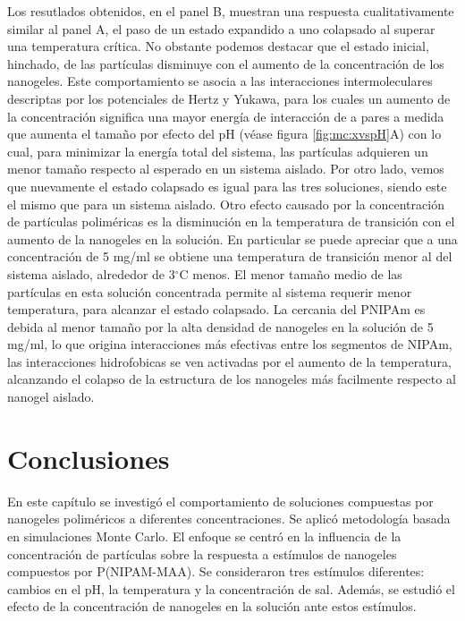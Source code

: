Los resutlados obtenidos, en el panel B, muestran una respuesta cualitativamente similar al panel A, el paso de un estado expandido a uno colapsado al superar una temperatura cr\'itica. No obstante podemos destacar que el estado inicial, hinchado, de las part\'iculas disminuye con el aumento de la concentraci\'on de los nanogeles. Este comportamiento se asocia a las interacciones intermoleculares descriptas por los potenciales de Hertz y Yukawa, para los cuales un aumento de la concentraci\'on significa una mayor energ\'ia de interacci\'on de a pares a medida que aumenta el tama\~no por efecto del pH (v\'ease figura \ref{fig:mc:xvspH}A) con lo cual, para minimizar la energ\'ia total del sistema, las part\'iculas adquieren un menor tama\~no respecto al esperado en un sistema aislado. Por otro lado, vemos que nuevamente el estado colapsado es igual para las tres soluciones, siendo este el mismo que para un sistema aislado.
Otro efecto causado por la concentraci\'on de part\'iculas polim\'ericas es la disminuci\'on en la temperatura de transici\'on con el aumento de la nanogeles en la soluci\'on. En particular se puede apreciar que a una concentraci\'on de 5 mg/ml se obtiene una temperatura de transici\'on menor al del sistema aislado, alrededor de 3$^\circ$C menos. El menor tama\~no medio de las part\'iculas en esta soluci\'on concentrada permite al sistema requerir menor temperatura, para alcanzar el estado colapsado. La cercania del PNIPAm  es debida al menor tama\~no por la alta densidad de nanogeles en la soluci\'on de 5 mg/ml, lo que origina interacciones m\'as efectivas entre los segmentos de NIPAm, las interacciones hidrofobicas se ven activadas por el aumento de la temperatura, alcanzando el colapso de la estructura de los nanogeles m\'as facilmente respecto al nanogel aislado.

	
	

	\section{Conclusiones}

	En este cap\'itulo se investig\'o el comportamiento de soluciones compuestas por nanogeles polim\'ericos a diferentes concentraciones. Se aplic\'o metodolog\'ia basada en simulaciones Monte Carlo. El enfoque se centr\'o en la influencia de la concentraci\'on de part\'iculas sobre la respuesta a est\'imulos de nanogeles compuestos por P(NIPAM-MAA). Se consideraron tres est\'imulos diferentes: cambios en el pH, la temperatura y la concentraci\'on de sal. Adem\'as, se estudi\'o el efecto de la concentraci\'on de nanogeles en la soluci\'on ante estos est\'imulos.
	
